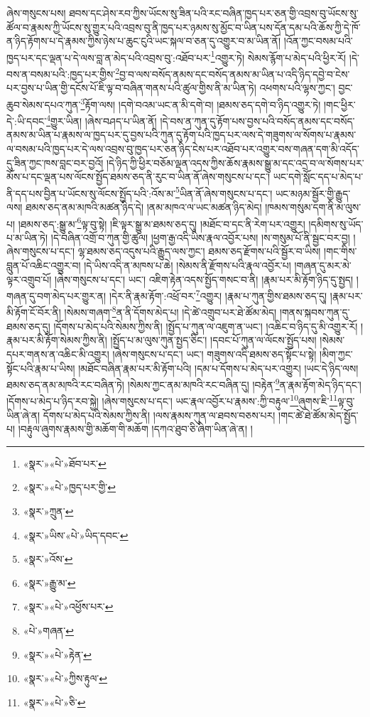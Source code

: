 ཞེས་གསུངས་པས། ཐབས་དང་ཤེས་རབ་ཀྱིས་ཡོངས་སུ་ཟིན་པའི་རང་བཞིན་ཁྱད་པར་ཅན་གྱི་འབྲས་བུ་ཡོངས་སུ་ཚོལ་བ་རྣམས་ཀྱི་ཡོངས་སུ་གྱུར་པའི་འབྲས་བུ་ནི་ཁྱད་པར་ཉམས་སུ་མྱོང་བ་ཡིན་པས་དོན་དམ་པའི་ཆོས་ཀྱི་དེ་ཁོ་ན་ཉིད་རྟོགས་པ་དེ་རྣམས་ཀྱིས་ཉེས་པ་ཆུང་ངུའི་ཡང་སྐལ་བ་ཅན་དུ་འགྱུར་བ་མ་ཡིན་ནོ། །འོན་ཀྱང་བསམ་པའི་ཁྱད་པར་དང་ལྡན་པ་དེ་ལས་བླ་ན་མེད་པའི་འབྲས་བུ་:འཐོབ་པར་\footnote{«སྣར་»«པེ་»ཐོབ་པར་}འགྱུར་ཏེ། སེམས་རྙོག་པ་མེད་པའི་ཕྱིར་རོ། །དེ་བས་ན་བསམ་པའི་:ཁྱད་པར་གྱིས་\footnote{«སྣར་»«པེ་»ཁྱད་པར་གྱི་}བྱ་བ་ལས་བསོད་ནམས་དང་བསོད་ནམས་མ་ཡིན་པ་འདི་ཉིད་དབྱེ་བ་ངེས་པར་བྱས་པ་ཡིན་གྱི་དངོས་པོ་ཇི་ལྟ་བ་བཞིན་གནས་པའི་ཚུལ་གྱིས་ནི་མ་ཡིན་ཏེ། འཕགས་པའི་ལྷས་ཀྱང་། བྱང་ཆུབ་སེམས་དཔའ་ཀུན་\footnote{«སྣར་»ཀྲུན་}རྟོག་ལས། །དགེ་བའམ་ཡང་ན་མི་དགེ་བ། །ཐམས་ཅད་དགེ་བ་ཉིད་འགྱུར་ཏེ། །གང་ཕྱིར་དེ་:ཡི་དབང་\footnote{«སྣར་»ཡིས་«པེ་»ཡིད་དབང་}གྱུར་ཡིན། །ཞེས་བཤད་པ་ཡིན་ནོ། །དེ་བས་ན་ཀུན་དུ་རྟོག་པས་བྱས་པའི་བསོད་ནམས་དང་བསོད་ནམས་མ་ཡིན་པ་རྣམས་ལ་ཁྱད་པར་དུ་བྱས་པའི་ཀུན་དུ་རྟོག་པའི་ཁྱད་པར་ལས་དེ་གཟུགས་ལ་སོགས་པ་རྣམས་ལ་བསམ་པའི་ཁྱད་པར་དེ་ལས་འབྲས་བུ་ཁྱད་པར་ཅན་ཉིད་ངེས་པར་འཐོབ་པར་འགྱུར་བས་གཞན་དག་མི་འདོད་དུ་ཟིན་ཀྱང་ཁས་བླང་བར་བྱའོ། །དེ་ཉིད་ཀྱི་ཕྱིར་བཅོམ་ལྡན་འདས་ཀྱིས་ཆོས་རྣམས་སྒྱུ་མ་དང་འདྲ་བ་ལ་སོགས་པར་མོས་པ་དང་ལྡན་པས་ལོངས་སྤྱོད་ཐམས་ཅད་ནི་རུང་བ་ཡིན་ནོ་ཞེས་གསུངས་པ་དང་། ཡང་དགེ་སློང་དད་པ་མེད་པ་ནི་དད་པས་བྱིན་པ་ཡོངས་སུ་ལོངས་སྤྱོད་པའི་:འོས་མ་\footnote{«སྣར་»འོས་}ཡིན་ནོ་ཞེས་གསུངས་པ་དང་། ཡང་མཉམ་སྦྱོར་གྱི་རྒྱུད་ལས། ཐམས་ཅད་ནམ་མཁའི་མཚན་ཉིད་དེ། །ནམ་མཁའ་ལ་ཡང་མཚན་ཉིད་མེད། །ཁམས་གསུམ་དག་ནི་མ་ལུས་པ། །ཐམས་ཅད་:སྒྱུ་མ་\footnote{«སྣར་»རྒྱུ་མ་}ལྟ་བུ་སྟེ། །ཇི་ལྟར་སྒྱུ་མ་ཐམས་ཅད་དུ། །མཐོང་བ་དང་ནི་རེག་པར་འགྱུར། །དམིགས་སུ་ཡོད་པ་མ་ཡིན་ཏེ། །དེ་བཞིན་འགྲོ་བ་ཀུན་གྱི་ཚུལ། །ཕྱག་རྒྱ་འདི་ཡིས་རྣལ་འབྱོར་པས། །ས་གསུམ་པོ་ནི་སྦྱང་བར་བྱ། །ཞེས་གསུངས་པ་དང་། ལྷ་ཐམས་ཅད་འདུས་པའི་རྒྱུད་ལས་ཀྱང་། ཐམས་ཅད་རྫོགས་པའི་སྦྱོར་བ་ཡིས། །གང་གིས་བླུན་པོ་འཆིང་འགྱུར་བ། །དེ་ཡིས་འདི་ན་མཁས་པ་ཆེ། །སེམས་ནི་རྫོགས་པའི་རྣལ་འབྱོར་པ། །གཞན་དུ་མར་མེ་ལྟར་འགྲུབ་པོ། །ཞེས་གསུངས་པ་དང་། ཡང་། འཇིག་རྟེན་འདས་སྤྱོད་གསང་བ་ནི། །རྣམ་པར་མི་རྟོག་ཉིད་དུ་སྤྱད། །གཞན་དུ་བག་མེད་པར་གྱུར་ན། །དེར་ནི་རྣམ་རྟོག་:འཕྲོ་བར་\footnote{«སྣར་»«པེ་»འཕྱོས་པར་}འགྱུར། །རྣམ་པ་ཀུན་གྱིས་ཐམས་ཅད་དུ། །རྣམ་པར་མི་རྟོག་ངོ་བོར་ནི། །སེམས་གཞག་\footnote{«པེ་»གཞན་}ན་ནི་དོགས་མེད་པ། །དེ་ཚེ་འགྲུབ་པར་ཐེ་ཚོམ་མེད། །གནས་སྐབས་ཀུན་དུ་ཐམས་ཅད་དུ། །དོགས་པ་མེད་པའི་སེམས་ཀྱིས་ནི། །སྤྱོད་པ་ཀུན་ལ་འཇུག་ན་ཡང་། །འཆིང་བ་ཉིད་དུ་མི་འགྱུར་རོ། །རྣམ་པར་མི་རྟོག་སེམས་ཀྱིས་ནི། །སྤྱོད་པ་མ་ལུས་ཀུན་སྤྱད་ཅིང་། །དབང་པོ་ཀུན་ལ་ལོངས་སྤྱོད་པས། །སེམས་དཔར་གནས་ན་འཆིང་མི་འགྱུར། །ཞེས་གསུངས་པ་དང་། ཡང་། གཟུགས་འདི་ཐམས་ཅད་སྟོང་པ་སྟེ། །མིག་ཀྱང་སྟོང་པའི་རྣམ་པ་ཡིས། །མཐོང་བཞིན་རྣམ་པར་མི་རྟོག་པའི། །དམ་པ་དོགས་པ་མེད་པར་འགྱུར། །ཡང་དེ་ཉིད་ལས། ཐམས་ཅད་ནམ་མཁའི་རང་བཞིན་ཏེ། །སེམས་ཀྱང་ནམ་མཁའི་རང་བཞིན་དུ། །བརྟེན་\footnote{«སྣར་»«པེ་»རྟེན་}ན་རྣམ་རྟོག་མེད་ཉིད་དང་། །དོགས་པ་མེད་པ་ཉིད་རབ་སྐྱེ། །ཞེས་གསུངས་པ་དང་། ཡང་རྣལ་འབྱོར་པ་རྣམས་:ཀྱི་བརྟུལ་\footnote{«སྣར་»«པེ་»ཀྱིས་རྟུལ་}ཞུགས་ཇི་\footnote{«སྣར་»«པེ་»ཅི་}ལྟ་བུ་ཡིན་ཞེ་ན། དོགས་པ་མེད་པའི་སེམས་ཀྱིས་ནི། །ལས་རྣམས་ཀུན་ལ་ཐབས་བཅས་པར། །གང་ཚེ་ཐེ་ཚོམ་མེད་སྤྱོད་པ། །བརྟུལ་ཞུགས་རྣམས་གྱི་མཆོག་གི་མཆོག །དཀའ་ཐུབ་ཅི་ཞིག་ཡིན་ཞེ་ན། །
